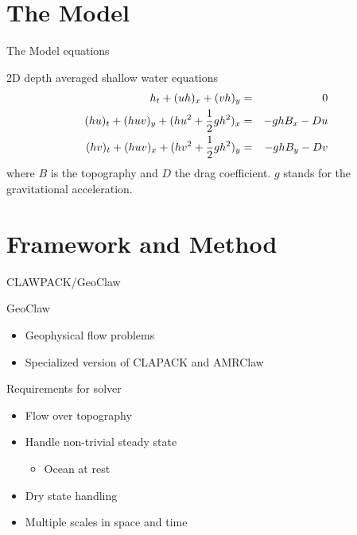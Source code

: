 \documentclass[xcolor=dvipsnames]{beamer}
\begin{document}
\section{The Model}
\label{sec-3}
\begin{frame}[label=sec-3-1]{The Model equations}
\begin{block}{2D depth averaged  shallow water equations}
\begin{eqnarray*}
h_t + (uh)_x + (vh)_y &=& 0\nonumber\\
(hu)_t + (huv)_y +(hu^2 + \frac{1}{2}gh^2)_x &=& -ghB_x - Du\\
(hv)_t + (huv)_x +(hv^2 + \frac{1}{2}gh^2)_y &=& -ghB_y - Dv
\end{eqnarray*}
where $B$ is the topography and $D$ the drag coefficient. $g$ stands for the gravitational acceleration.
\end{block}
\end{frame}

\section{Framework and Method}
\label{sec-4}
\begin{frame}[label=sec-4-1]{CLAWPACK/GeoClaw}
\begin{block}{GeoClaw}
\begin{itemize}
\item Geophysical flow problems
\item Specialized version of CLAPACK and AMRClaw
\end{itemize}
\end{block}

\begin{block}{Requirements for solver}
\begin{itemize}
\item Flow over topography
\item Handle non-trivial steady state
\begin{itemize}
\item Ocean at rest
\end{itemize}
\item Dry state handling
\item Multiple scales in space and time
\end{itemize}
\end{block}
\end{frame}
\end{document}

